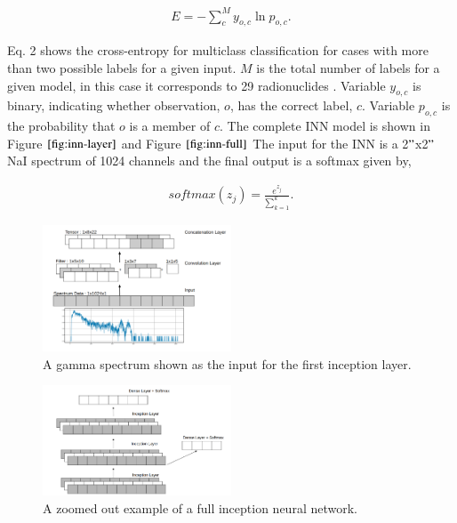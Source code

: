\documentclass[fleqn]{anstrans}
\begin{document}
\begin{equation}
	\begin{aligned}
		E = -\sum_{c}^{M}y_{o,c}\ln{p_{o,c}}.
	\end{aligned}
\end{equation}

Eq. 2 shows the cross-entropy for multiclass classification for cases with more than two possible labels 
for a given input. $M$ is the total number of labels for a given model, in this case it corresponds to 29 
radionuclides \cite{AmericanNationalStandard2016}. Variable $y_{o,c}$ is binary, indicating whether observation, $o$, has the correct label, $c$. 
Variable $p_{o,c}$ is the probability that $o$ is a member of $c$. The complete INN model is shown in Figure $\ref{fig:inn-layer}$ and Figure $\ref{fig:inn-full}$ 
The input for the INN is a 2$"$x2$"$ NaI spectrum of 1024 channels and the final output is a softmax given by,



\begin{equation}
	\begin{aligned}
		softmax(z_j) = \frac{e^{z_j}}{\sum_{k=1}^{k}}.
	\end{aligned}
\end{equation}


\begin{figure}[ht]
    \centering
    \includegraphics[width=0.5\textwidth]{../figures/inn_layer_improved.png}
    \caption{A gamma spectrum shown as the input for the first inception layer.}
    \label{fig:inn-layer}
\end{figure}
\begin{figure}[ht]
    \centering
    \includegraphics[width=0.5\textwidth]{../figures/inn-full-figure.png}
    \caption{A zoomed out example of a full inception neural network.}
    \label{fig:inn-full}
\end{figure}
\end{document}
